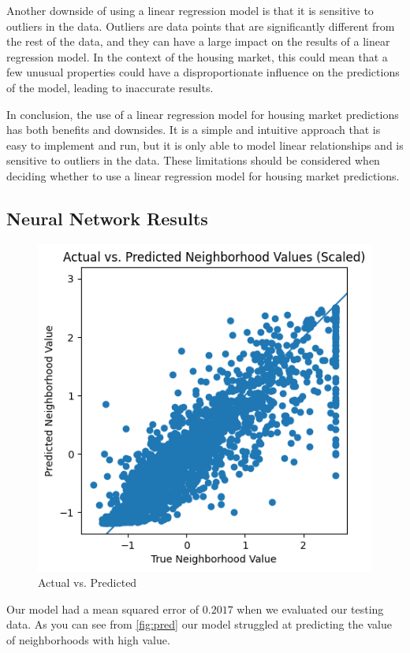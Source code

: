 \documentclass[11pt]{article}
\begin{document}
Another downside of using a linear regression model is that it is sensitive to outliers in the data. Outliers are data points that are significantly different from the rest of the data, and they can have a large impact on the results of a linear regression model. In the context of the housing market, this could mean that a few unusual properties could have a disproportionate influence on the predictions of the model, leading to inaccurate results.

In conclusion, the use of a linear regression model for housing market predictions has both benefits and downsides. It is a simple and intuitive approach that is easy to implement and run, but it is only able to model linear relationships and is sensitive to outliers in the data. These limitations should be considered when deciding whether to use a linear regression model for housing market predictions.

\subsection{Neural Network Results}

\begin{figure}[h]
\centering   
    \includegraphics[scale=.5]{predictions}
    \caption{Actual vs. Predicted}
    \label{fig:pred}
\end{figure}

Our model had a mean squared error of $0.2017$ when we evaluated our testing data. As you can see from \autoref{fig:pred} our model struggled at predicting the value of neighborhoods with high value.  
\end{document}
